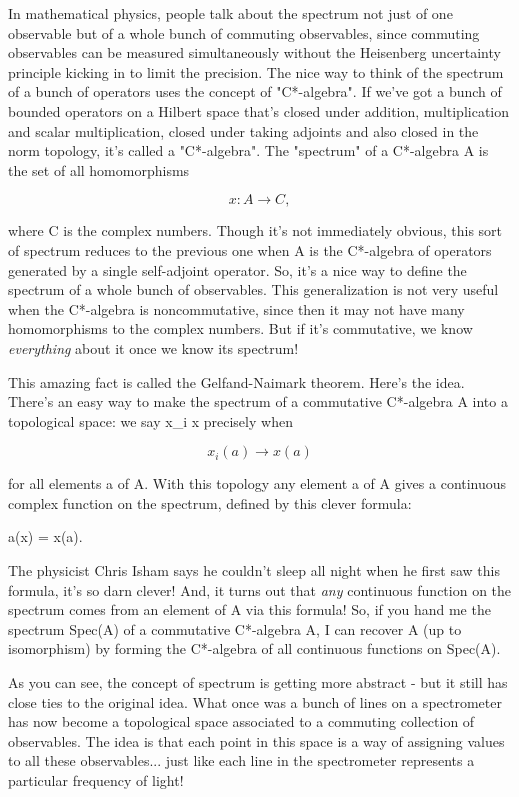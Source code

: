 In mathematical physics, people talk about the spectrum not just
of one observable but of a whole bunch of commuting observables, since
commuting observables can be measured simultaneously without the Heisenberg
uncertainty principle kicking in to limit the precision.   The nice way to 
think of the spectrum of a bunch of operators uses the concept of 
"C*-algebra".  If we've got a bunch of bounded operators on a Hilbert 
space that's closed under addition, multiplication and scalar 
multiplication, closed under taking adjoints and also closed in the 
norm topology, it's called a "C*-algebra".   The "spectrum" of a 
C*-algebra A is the set of all homomorphisms 

$$
x: A \to  C, 
$$
    
where C is the complex numbers.  Though it's not immediately obvious,
this sort of spectrum reduces to the previous one when A is the
C*-algebra of operators generated by a single self-adjoint operator.
So, it's a nice way to define the spectrum of a whole bunch of
observables.  This generalization is not very useful when the
C*-algebra is noncommutative, since then it may not have many
homomorphisms to the complex numbers.  But if it's commutative, we know
\emph{everything} about it once we know its spectrum!

This amazing fact is called the Gelfand-Naimark theorem.  Here's 
the idea.  There's an easy way to make the spectrum of a commutative
C*-algebra A into a topological space: we say x_{i} \to  x 
precisely when

$$
x_{i}(a) \to  x(a)
$$
    
for all elements a of A.  With this topology any
element a of A gives a continuous complex function on the spectrum, 
defined by this clever formula:

a(x) = x(a).

The physicist Chris Isham says he couldn't sleep all night when he
first saw this formula, it's so darn clever!  And, it turns out that
\emph{any} continuous function on the spectrum comes from an element of A
via this formula!  So, if you hand me the spectrum Spec(A) of a
commutative C*-algebra A, I can recover A (up to isomorphism) by
forming the C*-algebra of all continuous functions on Spec(A).

As you can see, the concept of spectrum is getting more abstract - but
it still has close ties to the original idea.  What once was a bunch
of lines on a spectrometer has now become a topological space
associated to a commuting collection of observables.  The idea is that
each point in this space is a way of assigning values to all these
observables... just like each line in the spectrometer represents a
particular frequency of light!

